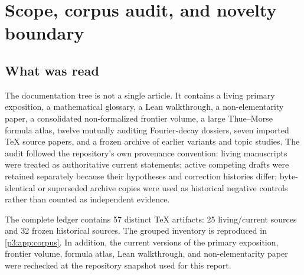 \documentclass[11pt,oneside]{article}
\numberwithin{equation}{section}
\theoremstyle{definition}
\theoremstyle{remark}
\begin{document}
\clearpage

\section{Scope, corpus audit, and novelty boundary}
\label{p3:sec:scope}

\subsection{What was read}

The documentation tree is not a single article.  It contains a living primary exposition, a mathematical glossary, a Lean walkthrough, a non-elementarity paper, a consolidated non-formalized frontier volume, a large Thue--Morse formula atlas, twelve mutually auditing Fourier-decay dossiers, seven imported TeX source papers, and a frozen archive of earlier variants and topic studies.  The audit followed the repository's own provenance convention: living manuscripts were treated as authoritative current statements; active competing drafts were retained separately because their hypotheses and correction histories differ; byte-identical or superseded archive copies were used as historical negative controls rather than counted as independent evidence.

The complete ledger contains 57 distinct TeX artifacts: 25 living/current sources and 32 frozen historical sources.  The grouped inventory is reproduced in \cref{p3:app:corpus}.  In addition, the current versions of the primary exposition, frontier volume, formula atlas, Lean walkthrough, and non-elementarity paper were rechecked at the repository snapshot used for this report.
\end{document}
